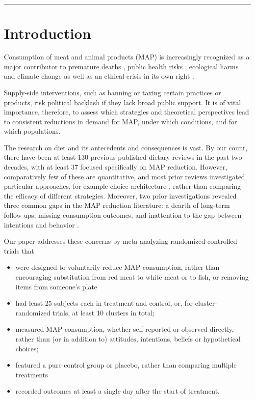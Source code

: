 \documentclass[sn-nature,pdflatex]{sn-jnl}
\begin{document}
\maketitle

\begin{center}\rule{0.5\linewidth}{0.5pt}\end{center}

\section{Introduction}\label{sec1}

Consumption of meat and animal products (MAP) is increasingly recognized
as a major contributor to premature deaths
\citep{willett2019, landry2023}, public health risks
\citep{slingenbergh2004, graham2008}, ecological harms
\citep{greger2010} and climate change
\citep{scarborough2023, koneswaran2008} as well as an ethical crisis in
its own right \citep{kuruc2023, singer2023}.

Supply-side interventions, such as banning or taxing certain practices
or products, risk political backlash if they lack broad public support.
It is of vital importance, therefore, to assess which strategies and
theoretical perspectives lead to consistent reductions in demand for
MAP, under which conditions, and for which populations.

The research on diet and its antecedents and consequences is vast. By
our count, there have been at least 130 previous published dietary
reviews in the past two decades, with at least 37 focused specifically
on MAP reduction. However, comparatively few of these are quantitative,
and most prior reviews investigated particular approaches, for example
choice architecture \citep{bianchi2018restructuring}, rather than
comparing the efficacy of different strategies. Moreover, two prior
investigations revealed three common gaps in the MAP reduction
literature: a dearth of long-term follow-ups, missing consumption
outcomes, and inattention to the gap between intentions and behavior
\citep{mathur2021meta, mathur2021effectiveness}.

Our paper addresses these concerns by meta-analyzing randomized
controlled trials that

\begin{itemize}
\item
  were designed to voluntarily reduce MAP consumption, rather than
  encouraging substitution from red meat to white meat or to fish, or
  removing items from someone's plate
\item
  had least 25 subjects each in treatment and control, or, for
  cluster-randomized trials, at least 10 clusters in total;
\item
  measured MAP consumption, whether self-reported or observed directly,
  rather than (or in addition to) attitudes, intentions, beliefs or
  hypothetical choices;
\item
  featured a pure control group or placebo, rather than comparing
  multiple treatments
\item
  recorded outcomes at least a single day after the start of treatment.
\end{itemize}
\end{document}
